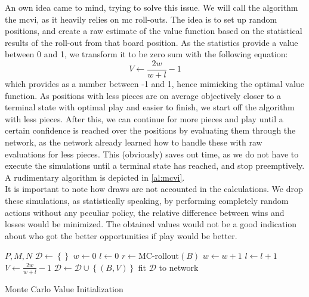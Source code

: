 An own idea came to mind, trying to solve this issue. We will call the algorithm the \gls{mcvi}, as it heavily relies on \gls{mc} roll-outs. The idea is to set up random positions, and create a raw estimate of the value function based on the statistical results of the roll-out from that board position. As the statistics provide a value between 0 and 1, we transform it to be zero sum with the following equation:
\begin{equation}
V\leftarrow\frac{2w}{w+l}-1
\label{eq:v_mcvi}
\end{equation}
which provides as a number between -1 and 1, hence mimicking the optimal value function. As positions with less pieces are on average objectively closer to a terminal state with optimal play and easier to finish, we start off the algorithm with less pieces. After this, we can continue for more pieces and play until a certain confidence is reached over the positions by evaluating them through the network, as the network already learned how to handle these with raw evaluations for less pieces. This (obviously) saves out time, as we do not have to execute the simulations until a terminal state has reached, and stop preemptively. A rudimentary algorithm is depicted in \ref{al:mcvi}. \\
It is important to note how draws are not accounted in the calculations. We drop these simulations, as statistically speaking, by performing completely random actions without any peculiar policy, the relative difference between wins and losses would be minimized. The obtained values would not be a good indication about who got the better opportunities if play would be better.\\ 

\begin{algorithm}
\begin{algorithmic}
\REQUIRE $P,M,N$
	\STATE$\mathcal{D}\leftarrow\left\{\right\}$
			\STATE $w\leftarrow0$
			\STATE $l\leftarrow0$
			\STATE $r\leftarrow\text{MC-rollout}(B)$
				\STATE $w\leftarrow w+1$
				\STATE $l\leftarrow l+1$
			\ENDIF
		\ENDFOR
		\STATE $V\leftarrow\frac{2w}{w+l}-1$
		\STATE $\mathcal{D}\leftarrow\mathcal{D}\cup\left\{(B,V)\right\}$ 
	\ENDFOR
	\STATE fit $\mathcal{D}$ to network
\ENDFOR
\end{algorithmic}
\caption{Monte Carlo Value Initialization}
\label{al:mcvi}
\end{algorithm}

